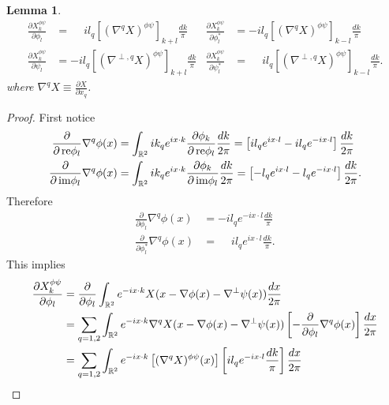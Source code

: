 \documentclass[noinfoline]{imsart}
\newtheorem{lemma}{Lemma}
\newcommand{\re}{\text{\,\rm re}}
\newcommand{\im}{\text{\,\rm im}}
\begin{document}
\begin{lemma}
\label{partialconj}
\begin{align}
\frac{\partial  X^{\phi\psi}_k}{\partial \phi_{ l} }  &=  \phantom{-}il_q[(\nabla^q X)^{\phi\psi}]_{k+l}\frac{dk}{\pi}&
\frac{\partial  X^{\phi\psi}_k}{\partial \phi^*_{ l} } &=  -il_q [(\nabla^q X)^{\phi\psi}]_{k-l}\frac{dk}{\pi} \\
\frac{\partial  X^{\phi\psi}_k}{\partial \psi_{ l} }  &=  -il_q[(\nabla^{\perp,q} X)^{\phi\psi}]_{k+l}\frac{dk}{\pi}&
\frac{\partial  X^{\phi\psi}_k}{\partial \psi^*_{ l} } &=  \phantom{-}il_q [(\nabla^{\perp,q} X)^{\phi\psi}]_{k-l}\frac{dk}{\pi}.
\end{align}
where $\nabla^q  X\equiv \frac{\partial  X}{\partial x_q}$.
\end{lemma}
\begin{proof}
First notice
\begin{align}
\label{partial1}
\frac{\partial}{\partial \re \phi_{ l}} \nabla^q \phi(x)  &= \int_{\Bbb R^2} i  k_q e^{ix \cdot k} \frac{\partial \phi_k}{\partial \re \phi_l }  \frac{d k}{2\pi}
=\left[i  l_q e^{ix \cdot  l}  - i  l_q e^{-i x \cdot  l}  \right] \frac{d k}{2\pi}   \\
\label{partial2}
\frac{\partial}{\partial \im \phi_{ l}}\nabla^q \phi(x) &= \int_{\Bbb R^2} i  k_q e^{ix \cdot  k} \frac{\partial \phi_ k}{\partial \im \phi_{l} }  \frac{d k}{2\pi}
=\left[-  l_q e^{ix \cdot  l}  -  l_q e^{-i x \cdot  l}  \right] \frac{d k}{2\pi}.
\end{align}
Therefore
\begin{align}
\frac{\partial}{\partial \phi_{l}}\nabla^q \phi(x)  &=  - i  l_q e^{-i x \cdot l} \frac{dk}{\pi}   \\
\frac{\partial}{\partial \phi^*_{ l}}\nabla^q \phi(x) &= \phantom{-} il_q e^{ix \cdot  l}\frac{dk}{\pi}.
\end{align}
This implies
\begin{align}
\nonumber \frac{\partial X^{\phi\psi}_k}{\partial \phi_{ l} }
&=  \frac{\partial}{\partial  \phi_{ l} } \int_{\Bbb R^2}  e^{-ix \cdot k} X(x-\nabla \phi(x)-\nabla^\perp \psi(x))\frac{dx}{2\pi} \\
\nonumber &= \sum_{q=1,2}  \int_{\Bbb R^2} e^{-ix \cdot k} \nabla^q X(x-\nabla \phi(x)-\nabla^\perp\psi(x))\left[ -\frac{\partial}{\partial \phi_{l}}\nabla^q \phi(x)\right]\frac{dx}{2\pi}\\
\nonumber &= \sum_{q=1,2}  \int_{\Bbb R^2} e^{-ix \cdot k} \left[(\nabla^q X)^{\phi\psi}(x)\right]\left[  i  l_q e^{-i x \cdot l} \frac{dk}{\pi}\right]\frac{dx}{2\pi}

\end{align}
\end{proof}
\end{document}
